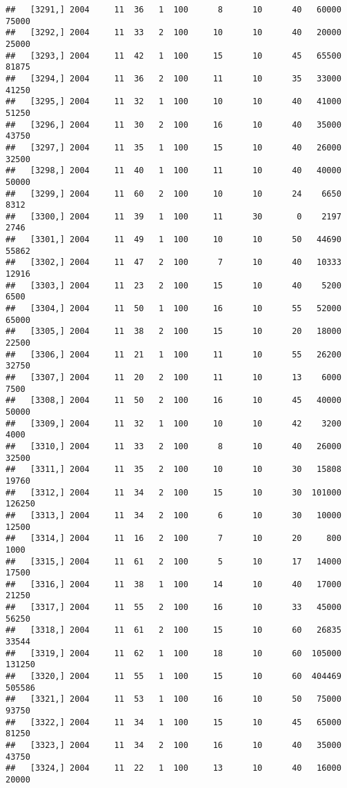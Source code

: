 \documentclass{article}\usepackage[]{graphicx}\usepackage[]{color}
\makeatletter
\newenvironment{kframe}{%
 \def\at@end@of@kframe{}%
 \ifinner\ifhmode%
  \def\at@end@of@kframe{\end{minipage}}%
  \begin{minipage}{\columnwidth}%
 \fi\fi%
 \def\FrameCommand##1{\hskip\@totalleftmargin \hskip-\fboxsep
 \colorbox{shadecolor}{##1}\hskip-\fboxsep
     \hskip-\linewidth \hskip-\@totalleftmargin \hskip\columnwidth}%
 \MakeFramed {\advance\hsize-\width
   \@totalleftmargin\z@ \linewidth\hsize
   \@setminipage}}%
 {\par\unskip\endMakeFramed%
 \at@end@of@kframe}
\newenvironment{knitrout}{}{} %
\makeatother
\begin{document}
\begin{knitrout}
\begin{kframe}
\begin{verbatim}
##   [3291,] 2004     11  36   1  100      8      10      40   60000   75000
##   [3292,] 2004     11  33   2  100     10      10      40   20000   25000
##   [3293,] 2004     11  42   1  100     15      10      45   65500   81875
##   [3294,] 2004     11  36   2  100     11      10      35   33000   41250
##   [3295,] 2004     11  32   1  100     10      10      40   41000   51250
##   [3296,] 2004     11  30   2  100     16      10      40   35000   43750
##   [3297,] 2004     11  35   1  100     15      10      40   26000   32500
##   [3298,] 2004     11  40   1  100     11      10      40   40000   50000
##   [3299,] 2004     11  60   2  100     10      10      24    6650    8312
##   [3300,] 2004     11  39   1  100     11      30       0    2197    2746
##   [3301,] 2004     11  49   1  100     10      10      50   44690   55862
##   [3302,] 2004     11  47   2  100      7      10      40   10333   12916
##   [3303,] 2004     11  23   2  100     15      10      40    5200    6500
##   [3304,] 2004     11  50   1  100     16      10      55   52000   65000
##   [3305,] 2004     11  38   2  100     15      10      20   18000   22500
##   [3306,] 2004     11  21   1  100     11      10      55   26200   32750
##   [3307,] 2004     11  20   2  100     11      10      13    6000    7500
##   [3308,] 2004     11  50   2  100     16      10      45   40000   50000
##   [3309,] 2004     11  32   1  100     10      10      42    3200    4000
##   [3310,] 2004     11  33   2  100      8      10      40   26000   32500
##   [3311,] 2004     11  35   2  100     10      10      30   15808   19760
##   [3312,] 2004     11  34   2  100     15      10      30  101000  126250
##   [3313,] 2004     11  34   2  100      6      10      30   10000   12500
##   [3314,] 2004     11  16   2  100      7      10      20     800    1000
##   [3315,] 2004     11  61   2  100      5      10      17   14000   17500
##   [3316,] 2004     11  38   1  100     14      10      40   17000   21250
##   [3317,] 2004     11  55   2  100     16      10      33   45000   56250
##   [3318,] 2004     11  61   2  100     15      10      60   26835   33544
##   [3319,] 2004     11  62   1  100     18      10      60  105000  131250
##   [3320,] 2004     11  55   1  100     15      10      60  404469  505586
##   [3321,] 2004     11  53   1  100     16      10      50   75000   93750
##   [3322,] 2004     11  34   1  100     15      10      45   65000   81250
##   [3323,] 2004     11  34   2  100     16      10      40   35000   43750
##   [3324,] 2004     11  22   1  100     13      10      40   16000   20000

\end{verbatim}
\end{kframe}
\end{knitrout}
\end{document}
